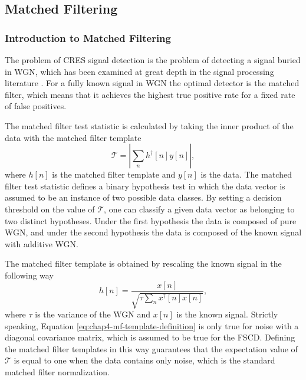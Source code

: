 \subsection{Matched Filtering}
\label{sec:chap4-matched-filtering-formalism}

\subsubsection*{Introduction to Matched Filtering}

The problem of CRES signal detection is the problem of detecting a signal buried in WGN, which has been examined at great depth in the signal processing literature \cite{detection_theory}. For a fully known signal in WGN the optimal detector is the matched filter, which means that it achieves the highest true positive rate for a fixed rate of false positives.

The matched filter test statistic is calculated by taking the inner product of the data with the matched filter template
\begin{equation}
    \mathcal{T}=\left|\sum_{n}{h^\dagger[n]y[n]}\right|,
    \label{eq:chap4-mf-test-stat-perfect}
\end{equation}
where $h[n]$ is the matched filter template and $y[n]$ is the data. The matched filter test statistic defines a binary hypothesis test in which the data vector is assumed to be an instance of two possible data classes. By setting a decision threshold on the value of $\mathcal{T}$, one can classify a given data vector as belonging to two distinct hypotheses. Under the first hypothesis the data is composed of pure WGN, and under the second hypothesis the data is composed of the known signal with additive WGN.

The matched filter template is obtained by rescaling the known signal in the following way
\begin{equation}
    h[n] = \frac{x[n]}{\sqrt{\tau \sum_{n}{x^\dagger[n]x[n]}}},
    \label{eq:chap4-mf-template-definition}
\end{equation}
where $\tau$ is the variance of the WGN and $x[n]$ is the known signal. Strictly speaking, Equation \ref{eq:chap4-mf-template-definition} is only true for noise with a diagonal covariance matrix, which is assumed to be true for the FSCD. Defining the matched filter templates in this way guarantees that the expectation value of $\mathcal{T}$ is equal to one when the data contains only noise, which is the standard matched filter normalization.

